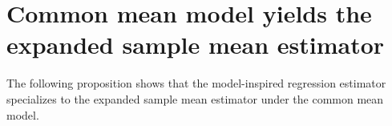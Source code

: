 

\section{Common mean model yields the expanded sample mean estimator}
\setcounter{theorem}{0}
\setcounter{equation}{0}


\renewcommand{\theenumi}{\roman{enumi}}
\renewcommand{\labelenumi}{\textnormal{(\theenumi)}$\;\;$}


The following proposition shows that the model-inspired regression estimator specializes to
the expanded sample mean estimator under the common mean model.
